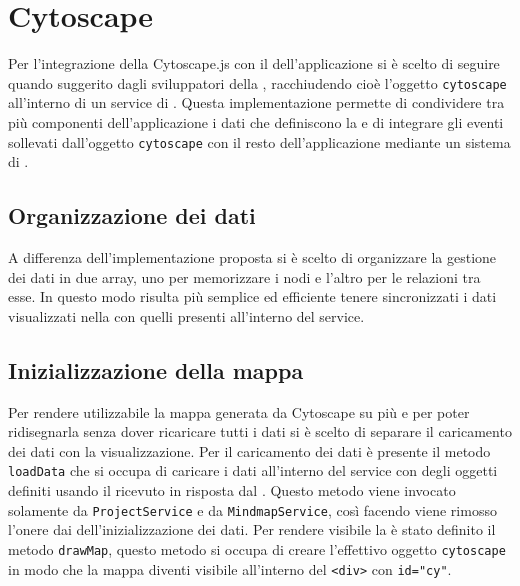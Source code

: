 \section{Cytoscape} \label{cytoApp}
Per l'integrazione della  Cytoscape.js con il  dell'applicazione si è scelto di seguire quando suggerito dagli sviluppatori della , racchiudendo cioè l'oggetto \texttt{cytoscape} all'interno di un service di .
Questa implementazione permette di condividere tra più componenti dell'applicazione i dati che definiscono la  e di integrare gli eventi sollevati dall'oggetto \texttt{cytoscape} con il resto dell'applicazione mediante un sistema di \textit{}.
\subsection{Organizzazione dei dati}
A differenza dell'implementazione proposta si è scelto di organizzare la gestione dei dati in due array, uno per memorizzare i nodi e l'altro per le relazioni tra esse. In questo modo risulta più semplice ed efficiente tenere sincronizzati i dati visualizzati nella  con quelli presenti all'interno del service.
\subsection{Inizializzazione della mappa}
Per rendere utilizzabile la mappa generata da Cytoscape su più  e per poter ridisegnarla senza dover ricaricare tutti i dati si è scelto di separare il caricamento dei dati con la visualizzazione.
Per il caricamento dei dati è presente il metodo \texttt{loadData} che si occupa di caricare i dati all'interno del service con degli oggetti definiti usando il  ricevuto in risposta dal . Questo metodo viene invocato solamente da \texttt{ProjectService} e da \texttt{MindmapService}, così facendo viene rimosso l'onere dai  dell'inizializzazione dei dati.
Per rendere visibile la  è stato definito il metodo \texttt{drawMap}, questo metodo si occupa di creare l'effettivo oggetto \texttt{cytoscape} in modo che la mappa diventi visibile all'interno del \texttt{<div>} con \texttt{id="cy"}.
